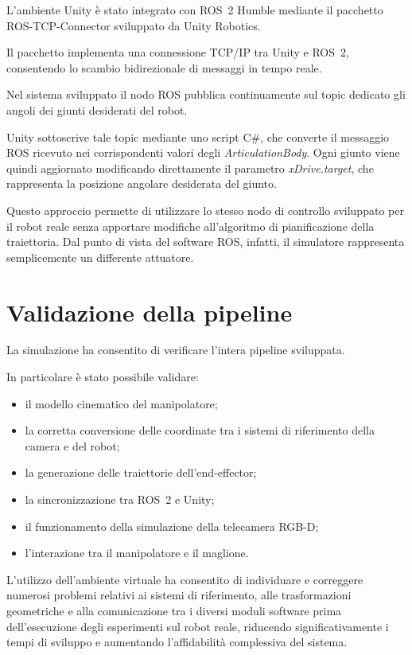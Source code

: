 L'ambiente Unity è stato integrato con ROS~2 Humble mediante il pacchetto ROS-TCP-Connector sviluppato da Unity Robotics.

Il pacchetto implementa una connessione TCP/IP tra Unity e ROS~2, consentendo lo scambio bidirezionale di messaggi in tempo reale.

Nel sistema sviluppato il nodo ROS pubblica continuamente sul topic dedicato gli angoli dei giunti desiderati del robot.

Unity sottoscrive tale topic mediante uno script C\#, che converte il messaggio ROS ricevuto nei corrispondenti valori degli \textit{ArticulationBody}. Ogni giunto viene quindi aggiornato modificando direttamente il parametro \textit{xDrive.target}, che rappresenta la posizione angolare desiderata del giunto.

Questo approccio permette di utilizzare lo stesso nodo di controllo sviluppato per il robot reale senza apportare modifiche all'algoritmo di pianificazione della traiettoria. Dal punto di vista del software ROS, infatti, il simulatore rappresenta semplicemente un differente attuatore.

\section{Validazione della pipeline}

La simulazione ha consentito di verificare l'intera pipeline sviluppata.

In particolare è stato possibile validare:

\begin{itemize}
    \item il modello cinematico del manipolatore;
    \item la corretta conversione delle coordinate tra i sistemi di riferimento della camera e del robot;
    \item la generazione delle traiettorie dell'end-effector;
    \item la sincronizzazione tra ROS~2 e Unity;
    \item il funzionamento della simulazione della telecamera RGB-D;
    \item l'interazione tra il manipolatore e il maglione.
\end{itemize}

L'utilizzo dell'ambiente virtuale ha consentito di individuare e correggere numerosi problemi relativi ai sistemi di riferimento, alle trasformazioni geometriche e alla comunicazione tra i diversi moduli software prima dell'esecuzione degli esperimenti sul robot reale, riducendo significativamente i tempi di sviluppo e aumentando l'affidabilità complessiva del sistema.

